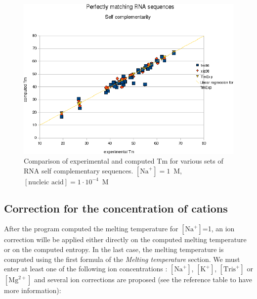 \documentclass{article}
\begin{document}
\begin{figure}[h]
\includegraphics[width=1\linewidth]{images/RNASelfComplementarity}
\caption{Comparison of experimental and computed Tm for various sets of
 RNA self complementary sequences. $[\mbox{Na}^+] = 1$~M, $[\mbox{nucleic acid}] = 1\cdot{}10^{-4}$~M}
\end{figure}     
  
\clearpage
\subsection{Correction for the concentration of cations}  

After the program computed the melting temperature for $[\mbox{Na}^+]$=1, an ion correction wille be applied
either directly on the computed melting temperature or on the computed entropy. In the last case, the melting
temperature is computed using the first formula of the \textit{Melting temperature} section.
We must enter at least one of the following ion concentrations : $[\mbox{Na}^+]$, $[\mbox{K}^+]$, $[\mbox{Tris}^+]$ or
$[\mbox{Mg}^{2+}]$ and several ion corrections are proposed  (see the reference table to have more information):
\end{document}
